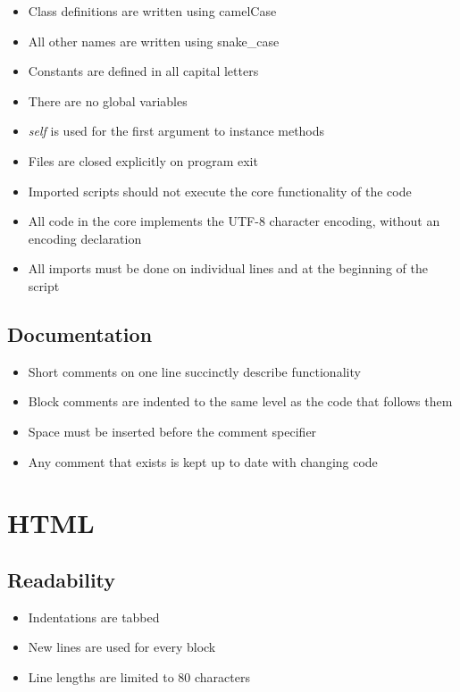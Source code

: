 \documentclass[11pt, a4paper]{article}
\begin{document}
\begin{itemize}
	\item Class definitions are written using camelCase
	\item All other names are written using snake\_case
	\item Constants are defined in all capital letters
	\item There are no global variables
	\item \textit{self} is used for the first argument to instance methods
	\item Files are closed explicitly on program exit
	\item Imported scripts should not execute the core functionality of the code
	\item All code in the core implements the UTF-8 character encoding, without an encoding declaration 
	\item All imports must be done on individual lines and at the beginning of the script
\end{itemize}

\subsection{Documentation}
\begin{itemize}
	\item Short comments on one line succinctly describe functionality 
	\item Block comments are indented to the same level as the code that follows them
	\item Space must be inserted before the comment specifier
	\item Any comment that exists is kept up to date with changing code 
\end{itemize}
\section{HTML}
\subsection{Readability}
\begin{itemize}
	\item Indentations are tabbed
	\item New lines are used for every block
	\item Line lengths are limited to 80 characters
\end{itemize}
\end{document}
